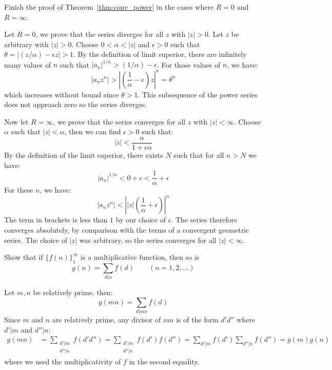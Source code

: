 \begin{exercise}
    Finish the proof of Theorem~\ref{thm:conv_power} in the cases where $R=0$ and $R=\infty$.
\end{exercise}
\begin{solution}
    Let $R= 0$, we prove that the series diverges for all $z$ with $|z| > 0$. Let $z$ be arbitrary with $ |z| > 0$. Choose $0 < \alpha < |z|$ and $\epsilon > 0$ such that $\theta = |(z/\alpha) - \epsilon z| > 1$. By the definition of limit superior, there are infinitely many values of $n$ such that $|a_n|^{1/n} > (1/\alpha) - \epsilon$. For those values of $n$, we have:
    \[
        |a_nz^n| > \left|\left(\frac{1}{\alpha} - \epsilon\right)z \right|^n = \theta^n
    \]
    which increases without bound since $\theta > 1$. This subsequence of the power series does not approach zero so the series diverges.

    Now let $R=\infty$, we prove that the series converges for all $z$ with $|z| < \infty$. Choose $\alpha$ such that $|z| < \alpha$, then we can find $\epsilon > 0$ such that:
    \[
        |z| < \frac{\alpha}{1+\epsilon\alpha}
    \]
    By the definition of the limit superior, there exists $N$ such that for all $n > N$ we have:
    \[
        |a_n|^{1/n} < 0 + \epsilon < \frac{1}{\alpha}+ \epsilon
    \]
    For these $n$, we have:
    \[
        |a_nz^n| < \left||z| \left(\frac{1}{\alpha}+\epsilon\right)\right|^n
    \]
    The term in brackets is less than $1$ by our choice of $\epsilon$. The series therefore converges absolutely, by comparison with the terms of a convergent geometric series. The choice of $|z|$ was arbitrary, so the series converges for all $|z| < \infty$.
\end{solution}

\begin{exercise}
    \label{ex:2-13}
    Show that if $\{f(n)\}_1^\infty$ is a multiplicative function, then so is 
    \[
        g(n) = \sum_{d \vert n} f(d) \qquad (n = 1,2, \ldots)
    \]
\end{exercise}
\begin{solution}
    Let $m, n$ be relatively prime, then:
    \[
        g(mn) = \sum_{d\vert mn} f(d)
    \]
    Since $m$ and $n$ are relatively prime, any divisor of $mn$ is of the form $d'd''$ where $d'\vert m$ and $d''\vert n$:
    \begin{align*}
        g(mn) &= \sum_{\substack{d' \vert m \\ d'' \vert n}} f(d'd'')= \sum_{\substack{d' \vert m \\ d'' \vert n}} f(d')f(d'') = \sum_{d'\vert m} f(d')\sum_{d''\vert n}f(d'') = g(m)g(n)
    \end{align*}
    where we used the multiplicativity of $f$ in the second equality.
\end{solution}

